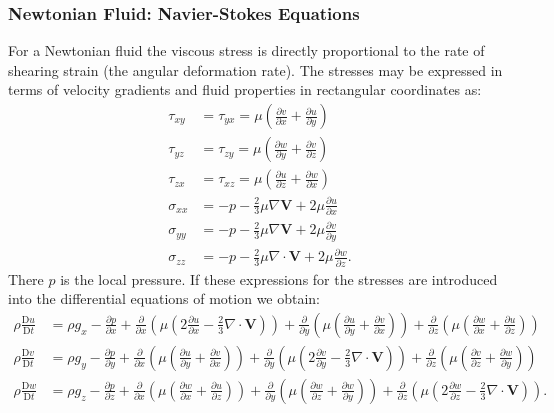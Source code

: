 \subsubsection{Newtonian Fluid: Navier-Stokes Equations} \label{sec:navsto}
For a Newtonian fluid the viscous stress is directly proportional to the rate of shearing strain (the angular deformation rate). The stresses may be expressed in terms of velocity gradients and fluid properties in rectangular coordinates as:
\begin{align*}
  \tau_{xy} &= \tau_{yx} = \mu \left( \frac{\partial v}{\partial x} + \frac{\partial u}{\partial y}  \right) \\
  \tau_{yz} &= \tau_{zy} = \mu \left( \frac{\partial w}{\partial y} + \frac{\partial v}{\partial z}  \right) \\
  \tau_{zx} &= \tau_{xz} = \mu \left( \frac{\partial u}{\partial z} + \frac{\partial w}{\partial x}  \right) \\
  \sigma_{x x} &= - p - \frac{2}{3} \mu \nabla \textbf{V} + 2 \mu \frac{\partial u}{\partial x}  \\
  \sigma_{yy} &= -p - \frac{2}{3} \mu \nabla  \textbf{V} + 2 \mu \frac{\partial v}{\partial y}  \\
  \sigma_{zz} &= -p - \frac{2}{3} \mu \nabla  \cdot \textbf{V} + 2 \mu \frac{\partial w}{\partial z} 
.\end{align*}
There $p$ is the local pressure. If these expressions for the stresses are introduced into the differential equations of motion we obtain:
\begin{align*}
  \rho \frac{\mathrm{D}u}{\mathrm{D}t} &= \rho g_x - \frac{\partial p}{\partial x} + \frac{\partial }{\partial x} \left( \mu \left( 2 \frac{\partial u}{\partial x} - \frac{2}{3} \nabla  \cdot \textbf{V} \right) \right) + \frac{\partial }{\partial y} \left( \mu \left( \frac{\partial u}{\partial y} + \frac{\partial v}{\partial x}  \right) \right) + \frac{\partial }{\partial z} \left( \mu \left( \frac{\partial w}{\partial x} + \frac{\partial u}{\partial z}  \right) \right) \\
  \rho \frac{\mathrm{D}v}{\mathrm{D}t} &= \rho g_y - \frac{\partial p}{\partial y} + \frac{\partial }{\partial x} \left( \mu \left( \frac{\partial u}{\partial y} + \frac{\partial v}{\partial x}  \right) \right) + \frac{\partial }{\partial y}\left( \mu \left( 2 \frac{\partial v}{\partial y} - \frac{2}{3} \nabla \cdot \textbf{V} \right) \right) + \frac{\partial }{\partial z} \left( \mu \left( \frac{\partial v}{\partial z} + \frac{\partial w}{\partial y}  \right) \right) \\
  \rho \frac{\mathrm{D}w}{\mathrm{D}t} &= \rho g_z - \frac{\partial p}{\partial z} + \frac{\partial }{\partial x} \left( \mu \left( \frac{\partial w}{\partial x} + \frac{\partial u}{\partial z}  \right) \right) + \frac{\partial }{\partial y}\left( \mu \left( \frac{\partial w}{\partial z} + \frac{\partial w}{\partial y}  \right) \right) + \frac{\partial }{\partial z} \left( \mu \left( 2 \frac{\partial w}{\partial z} - \frac{2}{3} \nabla \cdot \textbf{V} \right) \right)
.\end{align*}
